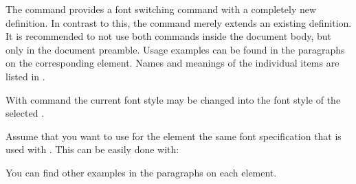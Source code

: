 The command  provides a font switching command with a
completely new definition. In contrast to this, the 
command merely extends an existing definition. It is recommended to not use
both commands inside the document body, but only in the document preamble.
Usage examples can be found in the paragraphs on the corresponding element.
\fi %
Names and meanings of the individual
items are listed in %
%
%
%
.  %
%
%

\ifIgnoreThis %
\else %
With command  the current font style may be changed into
the font style of the selected .%
\ifCommonmaincls %
\begin{Example}
  \label{desc:maincls.setkomafont.example}%
  Assume that you want to use for the element  the
  same font specification that is used with
  . This can be easily done with:
\begin{lstcode}
\end{lstcode}
  You can find other examples in the paragraphs on each element.
\end{Example}

